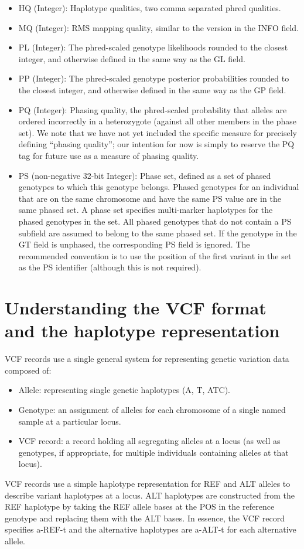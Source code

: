 \documentclass[8pt]{article}
\begin{document}
\begin{itemize}
  \item HQ (Integer): Haplotype qualities, two comma separated phred qualities.
  \item MQ (Integer): RMS mapping quality, similar to the version in the INFO field.
  \item PL (Integer): The phred-scaled genotype likelihoods rounded to the closest integer, and otherwise defined in the same way as the GL field.
  \item PP (Integer): The phred-scaled genotype posterior probabilities rounded to the closest integer, and otherwise defined in the same way as the GP field.
  \item PQ (Integer): Phasing quality, the phred-scaled probability that alleles are ordered incorrectly in a heterozygote (against all other members in the phase set).
  We note that we have not yet included the specific measure for precisely defining ``phasing quality''; our intention for now is simply to reserve the PQ tag for future use as a measure of phasing quality.
  \item PS (non-negative 32-bit Integer): Phase set, defined as a set of phased genotypes to which this genotype belongs.
  Phased genotypes for an individual that are on the same chromosome and have the same PS value are in the same phased set.
  A phase set specifies multi-marker haplotypes for the phased genotypes in the set.
  All phased genotypes that do not contain a PS subfield are assumed to belong to the same phased set.
  If the genotype in the GT field is unphased, the corresponding PS field is ignored.
  The recommended convention is to use the position of the first variant in the set as the PS identifier (although this is not required).
\end{itemize}


\section{Understanding the VCF format and the haplotype representation}
VCF records use a single general system for representing genetic variation data composed of:
\begin{itemize}
  \item Allele: representing single genetic haplotypes (A, T, ATC).
  \item Genotype: an assignment of alleles for each chromosome of a single named sample at a particular locus.
  \item VCF record: a record holding all segregating alleles at a locus (as well as genotypes, if appropriate, for multiple individuals containing alleles at that locus).
\end{itemize}
VCF records use a simple haplotype representation for REF and ALT alleles to describe variant haplotypes at a locus.
ALT haplotypes are constructed from the REF haplotype by taking the REF allele bases at the POS in the reference genotype and replacing them with the ALT bases.
In essence, the VCF record specifies a-REF-t and the alternative haplotypes are a-ALT-t for each alternative allele.
\end{document}

